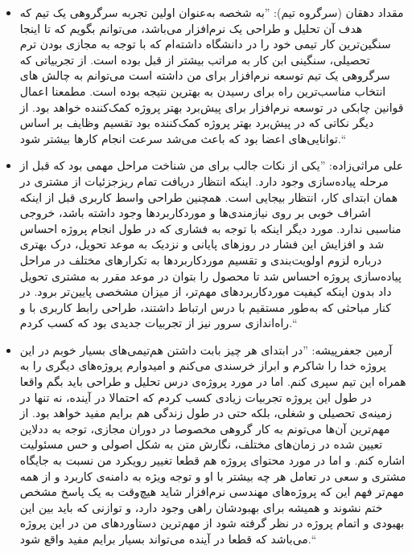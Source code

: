 \documentclass{report}
\begin{document}
\begin{itemize}
\item
مقداد دهقان (سرگروه تیم):
''به شخصه به‌عنوان اولین تجربه سرگروهی یک تیم که هدف آن تحلیل و طراحی یک نرم‌افزار می‌باشد، می‌توانم بگویم که تا اینجا سنگین‌ترین کار تیمی خود را در دانشگاه داشته‌ام که با توجه به مجازی بودن ترم تحصیلی، سنگینی ابن کار به مراتب بیشتر از قبل بوده است. از تجربیاتی که سرگروهی یک تیم توسعه نرم‌افزار برای من داشته است می‌توانم به چالش های انتخاب مناسب‌ترین راه برای رسیدن به بهترین نتیجه بوده است.
مطمعنا اعمال قوانین چابکی در توسعه نرم‌افزار برای پیش‌برد بهتر پروژه کمک‌کننده خواهد بود. از دیگر نکاتی که در پیش‌برد بهتر پروژه کمک‌کننده بود تقسیم وظایف بر اساس توانایی‌های اعضا بود که باعث می‌شد سرعت انجام کارها بیشتر شود.‌‌``
\item
علی مراثی‌زاده:
''یکی از نکات جالب برای من شناخت مراحل مهمی بود که قبل از مرحله پیاده‌سازی وجود دارد. اینکه انتظار دریافت تمام ریزجزئیات از مشتری در همان ابتدای کار، انتظار بیجایی است. همچنین طراحی واسط کاربری قبل از اینکه اشراف خوبی بر روی نیازمندی‌ها و موردکاربرد‌ها وجود داشته باشد، خروجی مناسبی ندارد. مورد دیگر اینکه با توجه به فشاری که در طول انجام پروژه احساس شد و افزایش این فشار در روزهای پایانی و نزدیک به موعد تحویل، درک بهتری درباره لزوم اولویت‌بندی و تقسیم موردکاربردها به تکرار‌های مختلف در مراحل پیاده‌سازی پروژه احساس شد تا محصول را بتوان در موعد مقرر به مشتری تحویل داد بدون اینکه کیفیت موردکاربرد‌های مهم‌تر، از میزان مشخصی پایین‌تر برود. در کنار مباحثی که به‌طور مستقیم با درس ارتباط داشتند، طراحی رابط کاربری با 
 و راه‌اندازی سرور 
  نیز از تجربیات جدیدی بود که کسب کردم.``
\item
آرمین جعفرپیشه:
''در ابتدای هر چیز بابت داشتن هم‌تیمی‌های بسیار خوبم در این پروژه خدا را شاکرم و ابراز خرسندی می‌کنم و امیدوارم پروژه‌های دیگری را به همراه این تیم سپری کنم. اما در مورد پروژه‌ی درس تحلیل و طراحی باید بگم واقعا در طول این پروژه تجربیات زیادی کسب کردم که احتمالا در آینده‌، نه تنها در زمینه‌ی تحصیلی و شغلی، بلکه حتی در طول زندگی هم برایم مفید خواهد بود. از مهم‌ترین آن‌ها می‌تونم به کار گروهی مخصوصا در دوران مجازی، توجه به ددلاین تعیین شده در زمان‌های مختلف، نگارش متن به شکل اصولی و حس مسئولیت اشاره کنم. و اما در مورد محتوای پروژه هم قطعا تغییر رویکرد من نسبت به جایگاه مشتری و سعی در تعامل هر چه بیشتر با او و توجه ویژه به دامنه‌ی کاربرد و از همه مهم‌تر فهم این که پروژه‌های مهندسی نرم‌افزار شاید هیچ‌وقت به یک پاسخ مشخص ختم نشوند و همیشه برای بهبودشان راهی وجود دارد، و توازنی که باید بین این بهبودی و اتمام پروژه در نظر گرفته شود از مهم‌ترین دستاوردهای من در این پروژه می‌باشد که قطعا در آینده می‌تواند بسیار برایم مفید واقع شود.‍‍‍‍‍‍``

\end{itemize}
\end{document}
